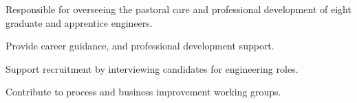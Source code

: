 {}
Responsible for overseeing the pastoral care and professional development of eight graduate and apprentice engineers.
\vspace{0.25em}
\begin{tightemize}
  \item Provide career guidance, and professional development support.
  \item Support recruitment by interviewing candidates for engineering roles.
  \item Contribute to process and business improvement working groups.
\end{tightemize}
\sectionsep
